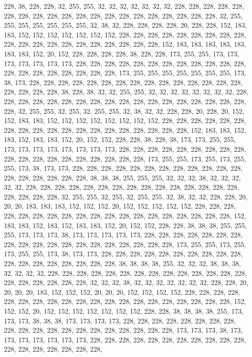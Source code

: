 {	228, 38,  228, 228, 32,  255, 255, 32,  32,  32,  32,  32,  32,  32,  228, 228, 228, 228, 228, 228, 228, 228, 228, 228, 228, 228, 228, 228, 228, 228, 228, 228, 228, 228, 32,  255, 255, 255, 255, 255, 255, 255, 32,  38,  32,  228, 228, 228, 228, 20,  228, 228, 152, 183, 183, 152, 152, 152, 152, 152, 152, 152, 228, 228, 228, 228, 228, 228, 228, 228, 228, 228, 228, 228, 228, 228, 228, 228, 228, 228, 228, 228, 152, 183, 183, 183, 183, 183, 183, 183, 152, 20,  152, 228, 228, 228, 228, 38,  228, 228, 173, 255, 255, 173, 173, 173, 173, 173, 173, 173, 228, 228, 228, 228, 228, 228, 228, 228, 228, 228, 228, 228, 228, 228, 228, 228, 228, 228, 228, 228, 173, 255, 255, 255, 255, 255, 255, 255, 173, 38,  173, 228, 228, 228, 228, 228, 228, 228, 228, 228, 228, 228, 228, 228, 228, 228, 228, 228, 228, 228, 
	38,  228, 38,  32,  32,  255, 255, 32,  32,  32,  32,  32,  32,  32,  32,  228, 228, 228, 228, 228, 228, 228, 228, 228, 228, 228, 228, 228, 228, 228, 228, 228, 228, 228, 32,  255, 255, 32,  255, 32,  255, 255, 32,  38,  32,  32,  228, 228, 20,  228, 20,  152, 152, 183, 183, 152, 152, 152, 152, 152, 152, 152, 152, 228, 228, 228, 228, 228, 228, 228, 228, 228, 228, 228, 228, 228, 228, 228, 228, 228, 228, 228, 152, 183, 183, 152, 183, 152, 183, 183, 152, 20,  152, 152, 228, 228, 38,  228, 38,  173, 173, 255, 255, 173, 173, 173, 173, 173, 173, 173, 173, 228, 228, 228, 228, 228, 228, 228, 228, 228, 228, 228, 228, 228, 228, 228, 228, 228, 228, 228, 173, 255, 255, 173, 255, 173, 255, 255, 173, 38,  173, 173, 228, 228, 228, 228, 228, 228, 228, 228, 228, 228, 228, 228, 228, 228, 228, 228, 228, 228, 
	38,  38,  38,  255, 255, 255, 32,  32,  32,  38,  32,  32,  32,  32,  32,  228, 228, 228, 228, 228, 228, 228, 228, 228, 228, 228, 228, 228, 228, 228, 228, 228, 228, 228, 32,  255, 255, 32,  255, 32,  255, 255, 32,  38,  32,  32,  228, 228, 20,  20,  20,  183, 183, 183, 152, 152, 152, 20,  152, 152, 152, 152, 152, 228, 228, 228, 228, 228, 228, 228, 228, 228, 228, 228, 228, 228, 228, 228, 228, 228, 228, 228, 152, 183, 183, 152, 183, 152, 183, 183, 152, 20,  152, 152, 228, 228, 38,  38,  38,  255, 255, 255, 173, 173, 173, 38,  173, 173, 173, 173, 173, 228, 228, 228, 228, 228, 228, 228, 228, 228, 228, 228, 228, 228, 228, 228, 228, 228, 228, 228, 173, 255, 255, 173, 255, 173, 255, 255, 173, 38,  173, 173, 228, 228, 228, 228, 228, 228, 228, 228, 228, 228, 228, 228, 228, 228, 228, 228, 228, 228, 
	38,  38,  38,  38,  255, 32,  32,  32,  38,  38,  38,  32,  32,  32,  32,  228, 228, 228, 228, 228, 228, 228, 228, 228, 228, 228, 228, 228, 228, 228, 228, 228, 228, 228, 228, 32,  32,  32,  38,  32,  32,  32,  32,  32,  32,  32,  228, 228, 20,  20,  20,  20,  183, 152, 152, 152, 20,  20,  20,  152, 152, 152, 152, 228, 228, 228, 228, 228, 228, 228, 228, 228, 228, 228, 228, 228, 228, 228, 228, 228, 228, 228, 228, 152, 152, 152, 20,  152, 152, 152, 152, 152, 152, 152, 228, 228, 38,  38,  38,  38,  255, 173, 173, 173, 38,  38,  38,  173, 173, 173, 173, 228, 228, 228, 228, 228, 228, 228, 228, 228, 228, 228, 228, 228, 228, 228, 228, 228, 228, 228, 228, 173, 173, 173, 38,  173, 173, 173, 173, 173, 173, 173, 228, 228, 228, 228, 228, 228, 228, 228, 228, 228, 228, 228, 228, 228, 228, 228, 228, 228, 
}
